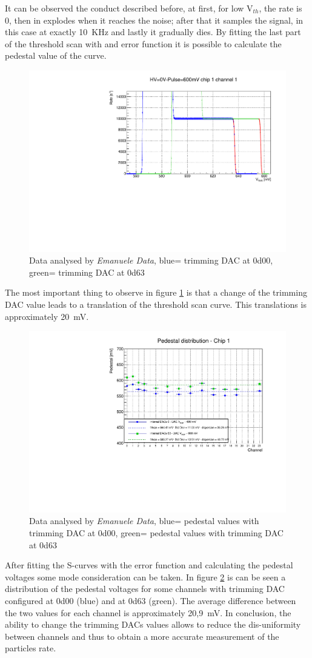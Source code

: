 It can be observed the conduct described before, at first, for low V$_{th}$, the rate is 0, then in explodes when it reaches the noise; after that it samples the signal, in this case at exactly 10~KHz and lastly it gradually dies. 
By fitting the last part of the threshold scan with and error function it is possible to calculate the pedestal value of the curve.
\begin{figure}[H]
	\centering
	\includegraphics[width=0.7\linewidth]{IMG/ch5/DataDacConfig/ThScan_ch0.pdf}
	\caption{Data analysed by \textit{Emanuele Data}, {\color{blue}blue}= trimming DAC at 0d00,\\{\color{green}green}= trimming DAC at 0d63}
	\label{fig:thscanch0}
\end{figure}
\noindent The most important thing to observe in figure \ref{fig:thscanch0} is that a change of the trimming DAC value leads to a translation of the threshold scan curve.
This translations is approximately 20~mV.
\begin{figure}[H]
	\centering
	\includegraphics[width=0.7\linewidth]{IMG/ch5/DataDacConfig/DAC_V_REF_600mv-Copia.pdf}
	\caption{Data analysed by \textit{Emanuele Data}, {\color{blue}blue}= pedestal values with trimming DAC at 0d00, {\color{green}green}= pedestal values with trimming DAC at 0d63}
	\label{fig:pedestal}
\end{figure}
\noindent After fitting the S-curves with the error function and calculating the pedestal voltages some mode consideration can be taken.
In figure \ref{fig:pedestal} is can be seen a distribution of the pedestal voltages for some channels with trimming DAC configured at 0d00 (blue) and at 0d63 (green).
The average difference between the two values for each channel is approximately 20,9~mV.
In conclusion, the ability to change the trimming DACs values allows to reduce the dis-uniformity between channels and thus to obtain a more accurate measurement of the particles rate.

